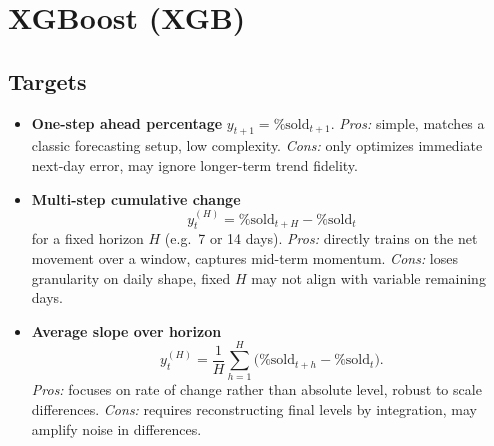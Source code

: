 \documentclass[a4paper,12pt]{report}  %
\begin{document}
\section{XGBoost (XGB)}

\subsection{Targets}
\begin{itemize}
  \item \textbf{One-step ahead percentage} \(y_{t+1} = \%\text{sold}_{t+1}\).  
        \emph{Pros:} simple, matches a classic forecasting setup, low complexity.  
        \emph{Cons:} only optimizes immediate next-day error, may ignore longer-term trend fidelity.  
  \item \textbf{Multi-step cumulative change} 
        \[
          y^{(H)}_t = \%\text{sold}_{t+H} - \%\text{sold}_{t}
        \]
        for a fixed horizon \(H\) (e.g.\ 7 or 14 days).  
        \emph{Pros:} directly trains on the net movement over a window, captures mid-term momentum.  
        \emph{Cons:} loses granularity on daily shape, fixed \(H\) may not align with variable remaining days.  
  \item \textbf{Average slope over horizon}
        \[
          y^{(H)}_t = \frac{1}{H}\sum_{h=1}^H\bigl(\%\text{sold}_{t+h}-\%\text{sold}_{t}\bigr).
        \]
        \emph{Pros:} focuses on rate of change rather than absolute level, robust to scale differences.  
        \emph{Cons:} requires reconstructing final levels by integration, may amplify noise in differences.  
\end{itemize}
\end{document}
